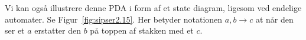 \begin{definition}
\begin{example}[$\{0^{n}1^{n} | n \ge 0\}$]
          Vi kan også illustrere denne PDA i form af et state diagram, ligesom ved endelige automater. Se Figur~\ref{fig:sipser2.15}. Her betyder notationen $a, b \rightarrow c$ at når den ser et $a$ erstatter den $b$ på toppen af stakken med et $c$.

\end{example}




\end{definition}






